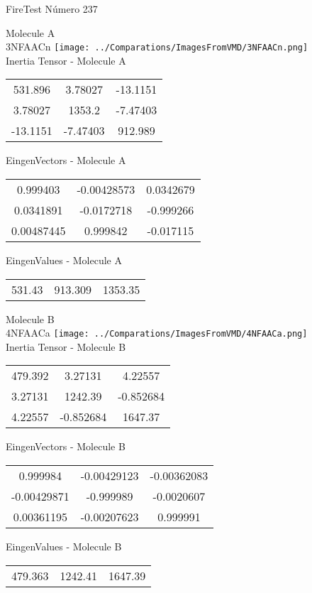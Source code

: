 \vtab[-2cm]
\begin{center}
{\large FireTest \tab Número 237}
\end{center}
\begin{multicols}{2}
\begin{center}

Molecule A \\ 
3NFAACn
\texttt{[image: ../Comparations/ImagesFromVMD/3NFAACn.png]}
\\
Inertia Tensor - Molecule A \\
\vtab

\begin{tabular}{|c c c|}
531.896	 & 	3.78027	 & 	-13.1151	 \\
3.78027	 & 	1353.2	 & 	-7.47403	 \\
-13.1151	 & 	-7.47403	 & 	912.989
\end{tabular}

\vtab
 EingenVectors - Molecule A     \\
\vtab
\begin{tabular}{|c c c|}
0.999403	 & 	-0.00428573	 & 	0.0342679	 \\
0.0341891	 & 	-0.0172718	 & 	-0.999266	 \\
0.00487445	 & 	0.999842	 & 	-0.017115
\end{tabular}

\vtab
 EingenValues - Molecule A     \\
\vtab
\begin{tabular}{|c c c|}
531.43	 & 	913.309	 & 	1353.35	 \\
\end{tabular}
\columnbreak

Molecule B \\ 
4NFAACa
\texttt{[image: ../Comparations/ImagesFromVMD/4NFAACa.png]}
\\
Inertia Tensor - Molecule B \\
\vtab

\begin{tabular}{|c c c|}
479.392	 & 	3.27131	 & 	4.22557	 \\
3.27131	 & 	1242.39	 & 	-0.852684	 \\
4.22557	 & 	-0.852684	 & 	1647.37
\end{tabular}

\vtab
 EingenVectors - Molecule B     \\
\vtab
\begin{tabular}{|c c c|}
0.999984	 & 	-0.00429123	 & 	-0.00362083	 \\
-0.00429871	 & 	-0.999989	 & 	-0.0020607	 \\
0.00361195	 & 	-0.00207623	 & 	0.999991
\end{tabular}

\vtab
 EingenValues - Molecule B     \\
\vtab
\begin{tabular}{|c c c|}
479.363	 & 	1242.41	 & 	1647.39	 \\
\end{tabular}

\end{center}
\end{multicols}

